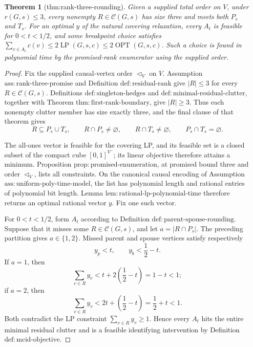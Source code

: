 \documentclass{article}
\newtheorem{theorem}{Theorem}
\begin{document}
\begin{theorem}[thm:rank-three-rounding]\label{thm:rank-three-rounding}
Given a supplied total order on \(V\), under \(r(G,s)\leq3\), every nonempty \(R\in\mathcal C(G,s)\) has size three and meets both \(P_s\) and \(T_s\). For an optimal \(y\) of the natural covering relaxation, every \(A_t\) is feasible for \(0<t<1/2\), and some breakpoint choice satisfies \(\sum_{v\in A_t}c(v)\leq2\operatorname{LP}(G,s,c)\leq2\operatorname{OPT}(G,s,c)\). Such a choice is found in polynomial time by the promised-rank enumerator using the supplied order.
\end{theorem}
\begin{proof}
Fix the supplied causal-vertex order \(\triangleleft_V\) on \(V\).
Assumption \(\mathrm{ass{:}rank\mbox{-}three\mbox{-}promise}\) and
Definition \(\mathrm{def{:}residual\mbox{-}rank}\) give \(|R|\leq3\) for
every \(R\in\mathcal C(G,s)\).  Definitions
\(\mathrm{def{:}singleton\mbox{-}hedges}\) and
\(\mathrm{def{:}minimal\mbox{-}residual\mbox{-}clutter}\), together with
Theorem \(\mathrm{thm{:}first\mbox{-}rank\mbox{-}boundary}\), give
\(|R|\geq3\).  Thus each nonempty clutter member has size exactly three,
and the final clause of that theorem gives
\[
 R\subseteq P_s\cup T_s,
 \qquad R\cap P_s\neq\varnothing,
 \qquad R\cap T_s\neq\varnothing,
 \qquad P_s\cap T_s=\varnothing.
\]

The all-ones vector is feasible for the covering LP, and its feasible set
is a closed subset of the compact cube \([0,1]^{V^{-}}\); its linear
objective therefore attains a minimum.  Proposition
\(\mathrm{prop{:}promised\mbox{-}enumeration}\), at promised bound three
and order \(\triangleleft_V\), lists all constraints.  On the canonical
causal encoding of Assumption
\(\mathrm{ass{:}uniform\mbox{-}poly\mbox{-}time\mbox{-}model}\), the list
has polynomial length and rational entries of polynomial bit length.
Lemma \(\mathrm{lem{:}rational\mbox{-}lp\mbox{-}polynomial\mbox{-}time}\)
therefore returns an optimal rational vector \(y\).  Fix one such vector.

For \(0<t<1/2\), form \(A_t\) according to Definition
\(\mathrm{def{:}parent\mbox{-}spouse\mbox{-}rounding}\).  Suppose that it
misses some \(R\in\mathcal C(G,s)\), and let
\(a=|R\cap P_s|\).  The preceding partition gives \(a\in\{1,2\}\).
Missed parent and spouse vertices satisfy respectively
\[
 y_p<t,
 \qquad y_b<\frac12-t.
\]
If \(a=1\), then
\[
 \sum_{v\in R}y_v
 <t+2\left(\frac12-t\right)=1-t<1;
\]
if \(a=2\), then
\[
 \sum_{v\in R}y_v
 <2t+\left(\frac12-t\right)=\frac12+t<1.
\]
Both contradict the LP constraint \(\sum_{v\in R}y_v\geq1\).  Hence every
\(A_t\) hits the entire minimal residual clutter and is a feasible
identifying intervention by Definition
\(\mathrm{def{:}mcid\mbox{-}objective}\).


\end{proof}
\end{document}

